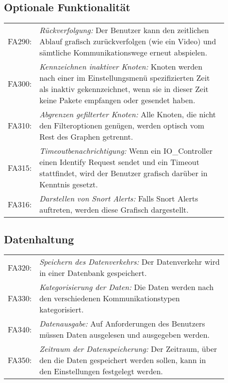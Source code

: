 \subsection{Optionale Funktionalität}
\begin{tabular}{lp{0.9\linewidth}}

FA290: & \textit{Rückverfolgung: }Der Benutzer kann den zeitlichen Ablauf grafisch zurückverfolgen (wie ein Video) und sämtliche Kommunikationswege erneut abspielen. \\

FA300: & \textit{Kennzeichnen inaktiver Knoten: }Knoten werden nach einer im Einstellungsmenü spezifizierten Zeit als inaktiv gekennzeichnet, wenn sie in dieser Zeit keine Pakete empfangen oder gesendet haben. \\

FA310: & \textit{Abgrenzen gefilterter Knoten: }Alle Knoten, die nicht den Filteroptionen genügen, werden optisch vom Rest des Graphen getrennt. \\

FA315: & \textit{Timeoutbenachrichtigung: }Wenn ein IO\_Controller einen Identify Request sendet und ein Timeout stattfindet, wird der Benutzer grafisch darüber in Kenntnis gesetzt.\\

FA316: & \textit{Darstellen von Snort Alerts: }Falls Snort Alerts auftreten, werden diese Grafisch dargestellt.

\end{tabular}

\subsection{Datenhaltung}

\begin{tabular}{lp{0.9\linewidth}}

FA320: & \textit{Speichern des Datenverkehrs: }Der Datenverkehr wird in einer Datenbank gespeichert. \\

FA330: & \textit{Kategorisierung der Daten: }Die Daten werden nach den verschiedenen Kommunikationstypen kategorisiert. \\

FA340: & \textit{Datenausgabe: }Auf Anforderungen des Benutzers müssen Daten ausgelesen und ausgegeben werden. \\

FA350: & \textit{Zeitraum der Datenspeicherung: }Der Zeitraum, über den die Daten gespeichert werden sollen, kann in den Einstellungen festgelegt werden. \\

\end{tabular}

